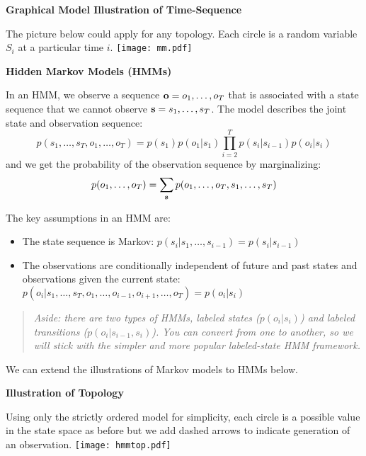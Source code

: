 \documentclass[11pt,titlepage]{article}
\begin{document}
\vskip 1.5in

{\bf Graphical Model Illustration of Time-Sequence}

The picture below could apply for any topology.  Each circle is a random
variable $S_i$ at a particular time $i$.
\texttt{[image: mm.pdf]}

\clearpage

\centerline{{\huge \bf Hidden Markov Models (HMMs)}}
\vskip 0.2in

In an HMM, we observe a sequence ${\bf o} = o_1, \ldots , o_T$
that is associated with a state sequence that we cannot observe
 ${\bf s} = s_1, \ldots , s_T$.  The model describes the joint state
and observation sequence:
$$p(s_1,\ldots , s_T, o_1,\ldots , o_T)
  = p(s_1)p(o_1|s_1)\prod_{i=2}^T p(s_i|s_{i-1})p(o_i|s_i) $$
and we get the probability of the observation sequence by marginalizing:
$$p(o_1, \ldots , o_T) = \sum_{{\bf s}} p(o_1, \ldots , o_T,s_1, \ldots , s_T )$$

The key assumptions in an HMM are:
\begin{itemize}
\item The state sequence is Markov: $p(s_i|s_1,\ldots , s_{i-1}) = p(s_i|s_{i-1})$
\item The observations are conditionally independent of future and
past states and observations given the current state:
$p(o_i|s_1,\ldots ,s_T,o_1,\ldots , o_{i-1},o_{i+1},\ldots , o_T) =
p(o_i|s_i)$
\end{itemize}

\begin{quote}
{\Large \em Aside: there are two types of HMMs, labeled states ($p(o_i|s_i)$)
and labeled transitions ($p(o_i|s_{i-1},s_i)$).  You can convert from one
to another, so we will stick with the simpler and more popular labeled-state
HMM framework.}
\end{quote}

\clearpage

We can extend the illustrations of Markov models to HMMs below.

{\bf Illustration of Topology}

Using only the strictly ordered model for simplicity, each circle is a
possible value in the state space as before but we add dashed arrows
to indicate generation of an observation.
\texttt{[image: hmmtop.pdf]}

\vskip 3in
\end{document}
